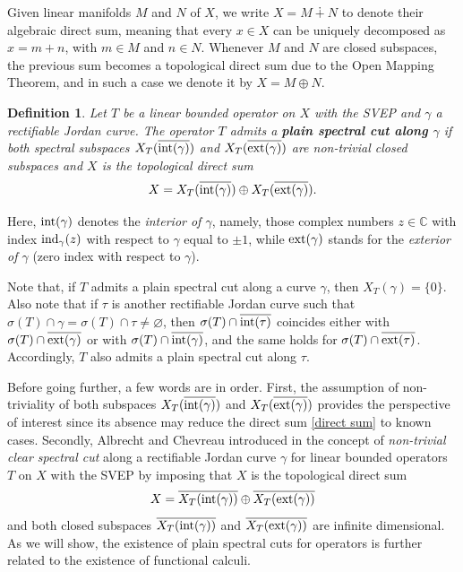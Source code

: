 \documentclass[11pt]{amsart}
\theoremstyle{definition}
\newtheorem*{definition*}{Definition}
\theoremstyle{remark}
\numberwithin{equation}{section}
\newcommand{\ind}{\textnormal{ind}}
\newcommand{\inte}{\textnormal{int}}
\newcommand{\exte}{\textnormal{ext}}
\begin{document}
\medskip

Given linear manifolds $M$ and $N$ of $X$, we write $X=M\dotplus N$ to denote their algebraic direct sum, meaning that every $x\in X$ can be uniquely decomposed as $x=m+n$, with $m\in M$ and $n\in N$. Whenever $M$ and $N$ are closed subspaces, the previous sum becomes a topological direct sum due to the Open Mapping Theorem, and in such a case we denote it by $X=M\oplus N$.

\medskip


\begin{definition*} \emph{Let $T$ be a linear bounded operator on $X$ with the SVEP and $\gamma$ a rectifiable Jordan curve. The operator $T$ admits a \textbf{plain spectral cut along $\gamma$} if both spectral subspaces ${X_T(\overline{\inte(\gamma)})}$ and $X_T(\overline{\exte(\gamma)})$ are non-trivial closed subspaces and $X$ is the topological direct sum
\begin{equation}\label{direct sum}
X = X_T(\overline{\inte(\gamma)}) \oplus X_T(\overline{\exte(\gamma)}).
\end{equation}}
\end{definition*}
\medskip

\noindent Here, $\inte(\gamma)$ denotes the \emph{interior of $\gamma$}, namely, those complex numbers $z\in \mathbb{C}$ with index $\ind_\gamma(z)$ with respect to $\gamma$   equal to $\pm 1$, while $\exte(\gamma)$ stands for the \emph{exterior of $\gamma$} (zero index with respect to $\gamma$).

\medskip


Note that, if $T$ admits a plain spectral cut along a curve $\gamma$, then $X_T(\gamma) = \{0\}$. Also note that if $\tau$ is another rectifiable Jordan curve such that $\sigma(T)\cap \gamma = \sigma(T)\cap \tau\neq \varnothing$, then $\sigma(T)\cap \overline{\inte(\tau)}$ coincides either with $\sigma(T)\cap \overline{\exte(\gamma)}$ or with $\sigma(T)\cap \overline{\inte(\gamma)}$, and the same holds for $\sigma(T)\cap \overline{\exte(\tau)}$. Accordingly, $T$ also admits a plain spectral cut along $\tau$.

\smallskip

Before going further, a few words are in order. First, the assumption of non-triviality of both subspaces  $X_T(\overline{\inte(\gamma)})$ and $X_T(\overline{\exte(\gamma)})$  provides the perspective of interest since its absence may reduce the direct sum \eqref{direct sum} to known cases. Secondly,  Albrecht and Chevreau  introduced
in \cite[Definition 2.1]{AA} the concept of \emph{non-trivial clear spectral cut} along a rectifiable Jordan curve $\gamma$ for linear bounded operators $T$ on $X$ with the SVEP by imposing that $X$ is the topological direct sum
$$
X = \overline{X_T(\inte(\gamma))} \oplus \overline{X_T(\exte(\gamma))}
$$
and both  closed subspaces $\overline{X_T(\inte(\gamma))}$ and $\overline{X_T(\exte(\gamma))}$ are infinite dimensional. As we will show, the existence of plain spectral cuts for operators is further related to the existence of functional calculi.
\end{document}

